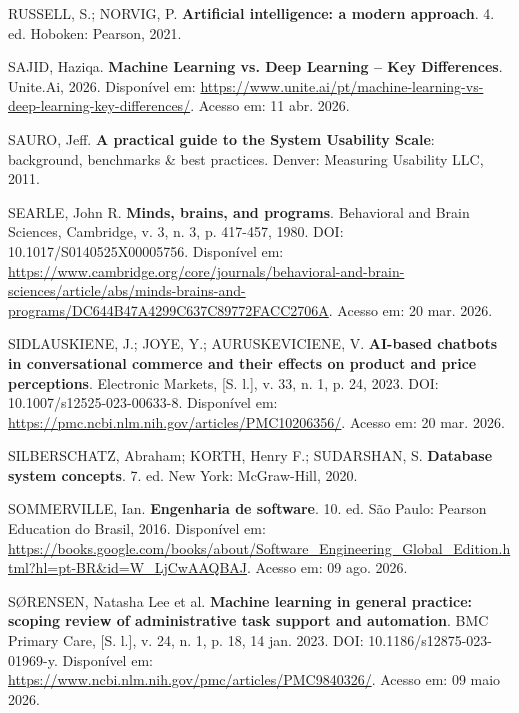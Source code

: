 \documentclass[12pt,a4paper]{extarticle}
\begin{document}
\vspace{0.5cm}\noindent
RUSSELL, S.; NORVIG, P. \textbf{Artificial intelligence: a modern approach}. 4. ed. Hoboken: Pearson, 2021.

\vspace{0.5cm}\noindent
SAJID, Haziqa. \textbf{Machine Learning vs. Deep Learning -- Key Differences}. Unite.Ai, 2026. Disponível em: \url{https://www.unite.ai/pt/machine-learning-vs-deep-learning-key-differences/}. Acesso em: 11 abr. 2026.

\vspace{0.5cm}\noindent
SAURO, Jeff. \textbf{A practical guide to the System Usability Scale}: background, benchmarks \& best practices. Denver: Measuring Usability LLC, 2011.

\vspace{0.5cm}\noindent
SEARLE, John R. \textbf{Minds, brains, and programs}. Behavioral and Brain Sciences, Cambridge, v. 3, n. 3, p. 417-457, 1980. DOI: 10.1017/S0140525X00005756. Disponível em: \url{https://www.cambridge.org/core/journals/behavioral-and-brain-sciences/article/abs/minds-brains-and-programs/DC644B47A4299C637C89772FACC2706A}. Acesso em: 20 mar. 2026.

\vspace{0.5cm}\noindent
SIDLAUSKIENE, J.; JOYE, Y.; AURUSKEVICIENE, V. \textbf{AI-based chatbots in conversational commerce and their effects on product and price perceptions}. Electronic Markets, [S. l.], v. 33, n. 1, p. 24, 2023. DOI: 10.1007/s12525-023-00633-8. Disponível em: \url{https://pmc.ncbi.nlm.nih.gov/articles/PMC10206356/}. Acesso em: 20 mar. 2026.

\vspace{0.5cm}\noindent
SILBERSCHATZ, Abraham; KORTH, Henry F.; SUDARSHAN, S. \textbf{Database system concepts}. 7. ed. New York: McGraw-Hill, 2020.

\vspace{0.5cm}\noindent
SOMMERVILLE, Ian. \textbf{Engenharia de software}. 10. ed. São Paulo: Pearson Education do Brasil, 2016. Disponível em: \url{https://books.google.com/books/about/Software_Engineering_Global_Edition.html?hl=pt-BR&id=W_LjCwAAQBAJ}. Acesso em: 09 ago. 2026.

\vspace{0.5cm}\noindent
SØRENSEN, Natasha Lee et al. \textbf{Machine learning in general practice: scoping review of administrative task support and automation}. BMC Primary Care, [S. l.], v. 24, n. 1, p. 18, 14 jan. 2023. DOI: 10.1186/s12875-023-01969-y. Disponível em: \url{https://www.ncbi.nlm.nih.gov/pmc/articles/PMC9840326/}. Acesso em: 09 maio 2026.
\end{document}
